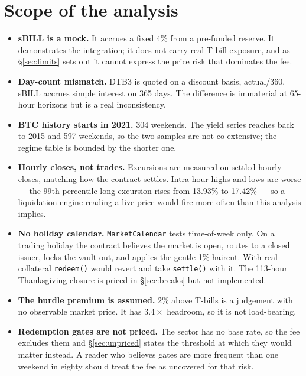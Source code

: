 \documentclass[11pt,a4paper]{article}
\begin{document}
\section{Scope of the analysis}

\begin{itemize}
\item \textbf{sBILL is a mock.} It accrues a fixed 4\% from a pre-funded reserve. It
      demonstrates the integration; it does not carry real T-bill exposure, and as
      \S\ref{sec:limits} sets out it cannot express the price risk that dominates the fee.
\item \textbf{Day-count mismatch.} DTB3 is quoted on a discount basis, actual/360. sBILL
      accrues simple interest on 365 days. The difference is immaterial at 65-hour
      horizons but is a real inconsistency.
\item \textbf{BTC history starts in 2021.} 304 weekends. The yield series reaches back to
      2015 and 597 weekends, so the two samples are not co-extensive; the regime table is
      bounded by the shorter one.
\item \textbf{Hourly closes, not trades.} Excursions are measured on settled hourly closes,
      matching how the contract settles. Intra-hour highs and lows are worse — the 99th
      percentile long excursion rises from 13.93\% to 17.42\% — so a liquidation engine
      reading a live price would fire more often than this analysis implies.
\item \textbf{No holiday calendar.} \texttt{MarketCalendar} tests time-of-week only. On a
      trading holiday the contract believes the market is open, routes to a closed issuer,
      locks the vault out, and applies the gentle 1\% haircut. With real collateral
      \texttt{redeem()} would revert and take \texttt{settle()} with it. The 113-hour
      Thanksgiving closure is priced in \S\ref{sec:breaks} but not implemented.
\item \textbf{The hurdle premium is assumed.} 2\% above T-bills is a judgement with no
      observable market price. It has $3.4\times$ headroom, so it is not load-bearing.
\item \textbf{Redemption gates are not priced.} The sector has no base rate, so the fee
      excludes them and \S\ref{sec:unpriced} states the threshold at which they would
      matter instead. A reader who believes gates are more frequent than one weekend in
      eighty should treat the fee as uncovered for that risk.
\end{itemize}
\end{document}
